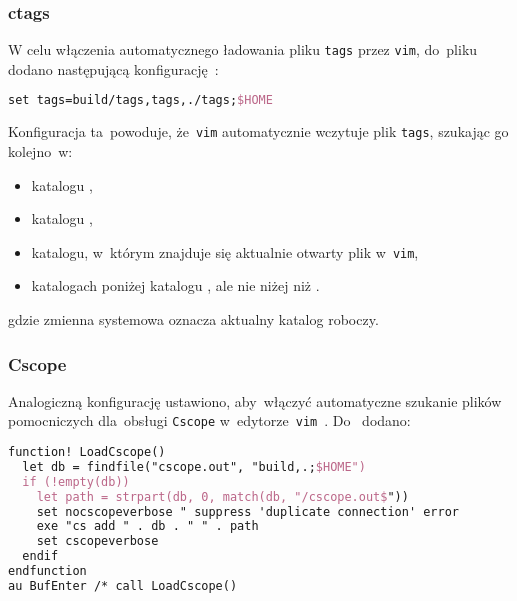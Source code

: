 \documentclass[thesis]{subfiles}
\begin{document}


\subsubsection{ctags}

W celu włączenia automatycznego ładowania pliku \texttt{tags} przez \texttt{vim}, do~pliku \mbox{} dodano następującą konfigurację~\cite{ctags,ctags-tricks}:
\begin{lstlisting}[language=tex,numbers=none,caption={Konfiguracja \texttt{ctags} w~pliku \texttt{.vimrc}}]
set tags=build/tags,tags,./tags;$HOME
\end{lstlisting}
Konfiguracja ta~powoduje, że~\texttt{vim} automatycznie wczytuje plik \texttt{tags}, szukając go kolejno~w:
\begin{itemize}[font=\ttfamily]
	\item katalogu ,
	\item katalogu ,
	\item katalogu, w~którym znajduje się aktualnie otwarty plik w~\texttt{vim},
	\item katalogach poniżej katalogu , ale nie niżej niż .
\end{itemize}
gdzie zmienna systemowa  oznacza aktualny katalog roboczy.


\subsubsection{Cscope}

Analogiczną konfigurację ustawiono, aby~włączyć automatyczne szukanie plików pomocniczych dla~obsługi \texttt{Cscope} w~edytorze~\texttt{vim}~\cite{cscope,cscope-autoload}. Do~ dodano:
\begin{lstlisting}[language=tex,numbers=none,caption={Konfiguracja \texttt{Cscope} w~pliku \texttt{.vimrc}}]
function! LoadCscope()
  let db = findfile("cscope.out", "build,.;$HOME")
  if (!empty(db))
    let path = strpart(db, 0, match(db, "/cscope.out$"))
    set nocscopeverbose " suppress 'duplicate connection' error
    exe "cs add " . db . " " . path
    set cscopeverbose
  endif
endfunction
au BufEnter /* call LoadCscope()
\end{lstlisting}
\end{document}
